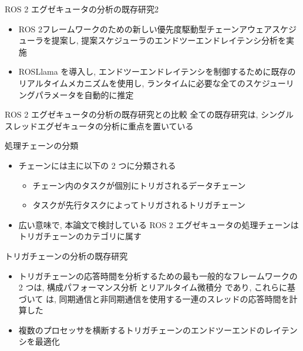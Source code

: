 \begin{frame}{ROS 2 エグゼキュータの分析の既存研究2}
    \begin{itemize}
        \item ROS 2フレームワークのための新しい優先度駆動型チェーンアウェアスケジューラを提案し, 提案スケジューラのエンドツーエンドレイテンシ分析を実施 \cite{choi2021picas}
        \item ROSLlama を導入し, エンドツーエンドレイテンシを制御するために既存のリアルタイムメカニズムを使用し, ランタイムに必要な全てのスケジューリングパラメータを自動的に推定 \cite{blass2021automatic}
    \end{itemize}
\end{frame}

\begin{frame}{ROS 2 エグゼキュータの分析の既存研究との比較}
    全ての既存研究は, シングルスレッドエグゼキュータの分析に重点を置いている
\end{frame}


\begin{frame}{処理チェーンの分類}
    \begin{itemize}
        \item チェーンには主に以下の 2 つに分類される
              \begin{itemize}
                  \item チェーン内のタスクが個別にトリガされるデータチェーン
                  \item タスクが先行タスクによってトリガされるトリガチェーン
              \end{itemize}
        \item 広い意味で, 本論文で検討している ROS 2 エグゼキュータの処理チェーンはトリガチェーンのカテゴリに属す
    \end{itemize}
\end{frame}

\begin{frame}{トリガチェーンの分析の既存研究}
    \begin{itemize}
        \item トリガチェーンの応答時間を分析するための最も一般的なフレームワークの 2 つは, 構成パフォーマンス分析 \cite{henia2005system} とリアルタイム微積分 \cite{chakraborty2003general} であり, これらに基づいて \cite{schlatow2016response} は, 同期通信と非同期通信を使用する一連のスレッドの応答時間を計算した
        \item 複数のプロセッサを横断するトリガチェーンのエンドツーエンドのレイテンシを最適化 \cite{schliecker2009recursive}
    \end{itemize}
\end{frame}

